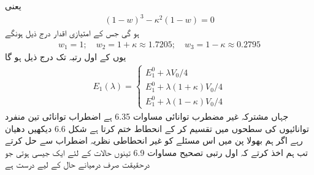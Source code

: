 یعنی
\begin{align*}
(1 - w)^3 - \kappa^2 (1 - w) = 0
\end{align*}
ہو گی جس کے امتیازی اقدار درج ذیل ہونگے 
\begin{align*}
w_1 = 1; \quad w_2 = 1+ \kappa \approx 1.7205; \quad w_3 = 1 - \kappa \approx 0.2795
\end{align*}
یوں  کے اول رتبہ تک درج ذیل ہو گا 
\begin{align}
E_1 (\lambda) = 
\begin{cases}
E_1^0 + \lambda V_0/4 \\
E_1^0 + \lambda (1+ \kappa) V_0 /4 \\
E_1^0 + \lambda (1 - \kappa) V_0 /4
\end{cases}
\end{align}
جہاں  مشترکہ غیر مضطرب توانائی مساوات 6.35 ہے اضطراب توانائی  تین منفرد توانائیوں کی سطحوں میں تقسیم کر کے انحطاط ختم  کرتا ہے شکل 6.6 دیکھیں دھیان رہے اگر ہم بھولا پن میں اس مسئلے کو غیر انحطاطی نظریہ اضطراب سے حل کرتے تب ہم اخذ کرتے کہ اول رتبی تصحیح مساوات 6.9 تینوں حالات کے لئے ایک جیسی  ہوتی جو درحقیقت صرف درمیانے حال کے لیے درست ہے 

